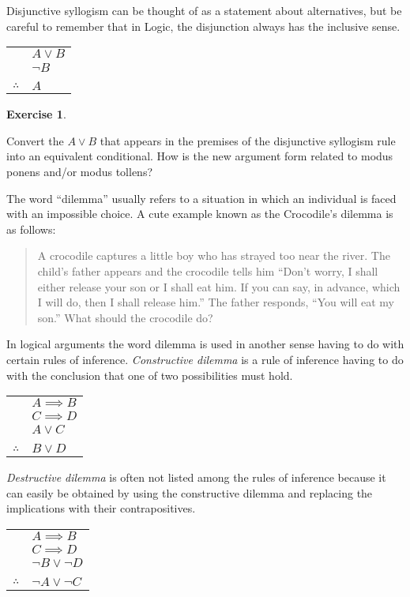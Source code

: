\documentclass[10pt,]{book}
\theoremstyle{plain}
\theoremstyle{definition}
\theoremstyle{definition}
\newtheorem{exercise}[theorem]{Exercise}
\numberwithin{equation}{section}
\newcommand{\hrulethin}  {\noalign{\hrule height 0.04em}}
\begin{document}
    Disjunctive syllogism can be thought of as a statement about
    alternatives, but be careful to remember that in Logic, the disjunction
    always has the inclusive sense.
\begin{tabular}{ll}
&\(A \lor B\)\tabularnewline[0pt]
&\({\lnot}B\)\tabularnewline[0pt]
&\tabularnewline\hrulethin
\(\therefore\)&\(A\)
\end{tabular}
\begin{exercise}\label{exercise-15}

        Convert the \(A \lor B\) that appears in the premises of the disjunctive
        syllogism rule into an equivalent conditional. How is the new argument
        form related to modus ponens and/or modus tollens?
\end{exercise}
\par

    The word ``dilemma'' usually refers to a situation in which an individual
    is faced with an impossible choice. A cute example known as the
    Crocodile's dilemma is as follows:
\begin{quote}
  A crocodile captures a little boy who has strayed too near the river.  The 
  child's father appears and the crocodile tells him ``Don't worry, I shall 
  either release your son or I shall eat him.  If you can say, in advance,
  which I will do, then I shall release him.''  The father responds, ``You will
  eat my son.''  What should the crocodile do?
  \end{quote}
\par

    In logical arguments the word dilemma is used in another sense having to
    do with certain rules of inference.
    \emph{Constructive dilemma} is
    a rule of inference having to do with the conclusion that one of two
    possibilities must hold.
\begin{tabular}{ll}
&\(A \implies B\)\tabularnewline[0pt]
&\(C \implies D\)\tabularnewline[0pt]
&\(A \lor C\)\tabularnewline[0pt]
&\tabularnewline\hrulethin
\(\therefore\)&\(B \lor D\)
\end{tabular}
\par

    \emph{Destructive dilemma}
    is often not listed among the rules
    of inference because it can easily be obtained by using the constructive
    dilemma and replacing the implications with their contrapositives.
\begin{tabular}{ll}
&\(A \implies B\)\tabularnewline[0pt]
&\(C \implies D\)\tabularnewline[0pt]
&\({\lnot}B \lor {\lnot}D\)\tabularnewline[0pt]
&\tabularnewline\hrulethin
\(\therefore\)&\({\lnot}A \lor {\lnot}C\)
\end{tabular}
\par
\end{document}
